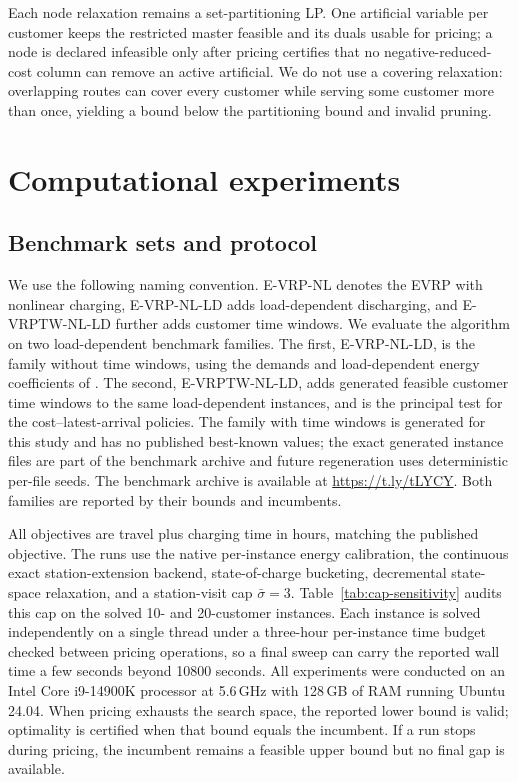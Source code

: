 \documentclass[review,3p,authoryear]{elsarticle}
\theoremstyle{plain}
\theoremstyle{definition}
\theoremstyle{remark}
\begin{document}
Each node relaxation remains a set-partitioning LP. One artificial variable per
customer keeps the restricted master feasible and its duals usable for pricing; a node
is declared infeasible only after pricing certifies that no negative-reduced-cost
column can remove an active artificial. We do not use a covering relaxation: overlapping
routes can cover every customer while serving some customer more than once, yielding a
bound below the partitioning bound and invalid pruning.

\section{Computational experiments}
\label{sec:results}

\subsection{Benchmark sets and protocol}
We use the following naming convention. E-VRP-NL denotes the EVRP with nonlinear
charging, E-VRP-NL-LD adds load-dependent discharging, and E-VRPTW-NL-LD further
adds customer time windows. We evaluate the algorithm on two load-dependent benchmark
families. The first, E-VRP-NL-LD, is the family without time windows, using the
demands and load-dependent energy coefficients of \citet{KancharlaRamadurai2020}.
The second, E-VRPTW-NL-LD, adds generated feasible customer time windows to the same
load-dependent instances, and is the principal test for the
cost--latest-arrival policies. The family with time windows is generated for this
study and has no published best-known
values; the exact generated instance files are part of the benchmark archive and
future regeneration uses deterministic per-file seeds. The benchmark archive is
available at \url{https://t.ly/tLYCY}. Both families are reported by their bounds and
incumbents.

All objectives are travel plus charging time in hours, matching the published
objective. The runs use the native
per-instance energy calibration, the continuous exact station-extension backend,
state-of-charge bucketing, decremental state-space relaxation, and a station-visit
cap \(\bar\sigma=3\). Table~\ref{tab:cap-sensitivity} audits this cap on the
solved 10- and 20-customer instances. Each instance is solved independently on a
single thread under a three-hour per-instance time
budget checked between pricing operations, so a final sweep can carry the reported
wall time a few seconds beyond 10800 seconds. All experiments were conducted on an Intel Core i9-14900K
processor at 5.6\,GHz with 128\,GB of RAM running Ubuntu 24.04. When pricing
exhausts the search space, the reported lower bound is valid; optimality is
certified when that bound equals the incumbent. If a run stops during pricing, the
incumbent remains a feasible upper bound but no final gap is available.
\end{document}
